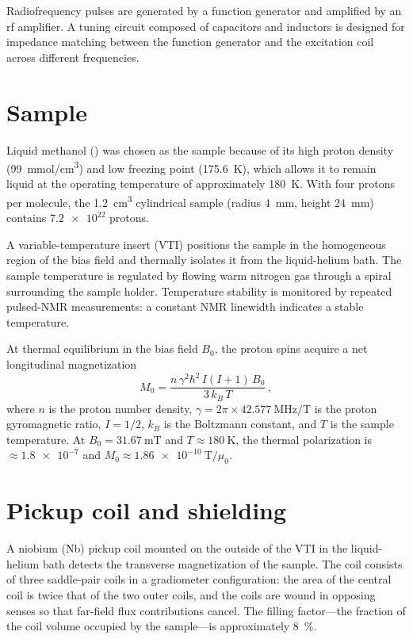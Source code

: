 Radiofrequency pulses are generated by a function generator and amplified by an rf amplifier. A tuning circuit composed of capacitors and inductors is designed for impedance matching between the function generator and the excitation coil across different frequencies.

\section{Sample}\label{sec:apparatus:sample}

Liquid methanol () was chosen as the sample because of its high proton density (\SI{99}{\mmol/\cm^3}) and low freezing point (\SI{175.6}{\kelvin}), which allows it to remain liquid at the operating temperature of approximately \SI{180}{\kelvin}. With four protons per molecule, the \SI{1.2}{\cm^3} cylindrical sample (radius \SI{4}{\mm}, height \SI{24}{\mm}) contains $\num{7.2e22}$ protons.

A variable-temperature insert (VTI) positions the sample in the homogeneous region of the bias field and thermally isolates it from the liquid-helium bath. The sample temperature is regulated by flowing warm nitrogen gas through a spiral surrounding the sample holder. Temperature stability is monitored by repeated pulsed-NMR measurements: a constant NMR linewidth indicates a stable temperature.

At thermal equilibrium in the bias field $B_0$, the proton spins acquire a net longitudinal magnetization
\begin{equation}
    M_0 = \frac{n\,\gamma^2\hbar^2\,I(I+1)\,B_0}{3\,k_B\,T}
    \,,\label{eq:M0}
\end{equation}
where $n$ is the proton number density, $\gamma = 2\pi\times\SI{42.577}{\MHz/\tesla}$ is the proton gyromagnetic ratio, $I=1/2$, $k_B$ is the Boltzmann constant, and $T$ is the sample temperature. At $B_0 = \SI{31.67}{\milli\tesla}$ and $T \approx \SI{180}{\kelvin}$, the thermal polarization is $\approx\num{1.8e-7}$ and $M_0 \approx \SI{1.86e-10}{\tesla}/\mu_0$.


\section{Pickup coil and shielding}\label{sec:apparatus:pickup}

A niobium (Nb) pickup coil mounted on the outside of the VTI in the liquid-helium bath detects the transverse magnetization of the sample. The coil consists of three saddle-pair coils in a gradiometer configuration: the area of the central coil is twice that of the two outer coils, and the coils are wound in opposing senses so that far-field flux contributions cancel. The filling factor---the fraction of the coil volume occupied by the sample---is approximately \SI{8}{\%}.

